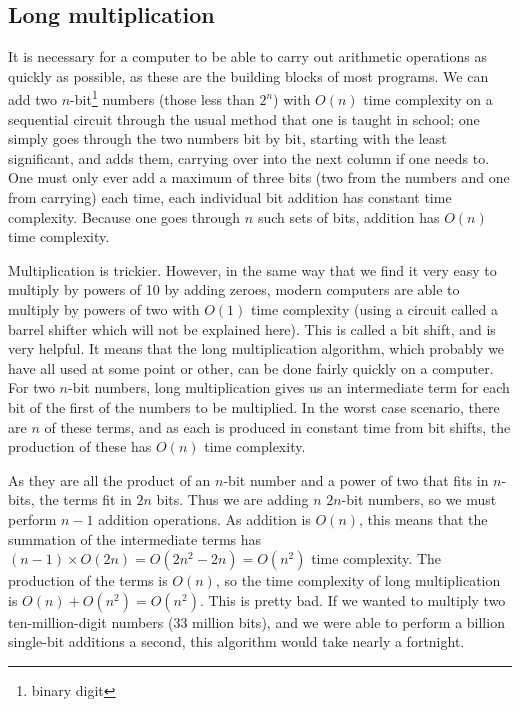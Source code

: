 \documentclass[12pt,a4paper]{report}
\begin{document}
\begin{multicols}{2}
	
\subsection{Long multiplication}
It is necessary for a computer to be able to carry out arithmetic operations as quickly as possible, as these are the building blocks of most programs. We can add two \(n\)-bit\footnote{binary digit} numbers (those less than \(2^n\)) with \(O(n)\) time complexity on a sequential circuit through the usual method that one is taught in school; one simply goes through the two numbers bit by bit, starting with the least significant, and adds them, carrying over into the next column if one needs to. One must only ever add a maximum of three bits (two from the numbers and one from carrying) each time, each individual bit addition has constant time complexity. Because one goes through \(n\) such sets of bits, addition has \(O(n)\) time complexity.

Multiplication is trickier. However, in the same way that we find it very easy to multiply by powers of 10 by adding zeroes, modern computers are able to multiply by powers of two with \(O(1)\) time complexity (using a circuit called a barrel shifter which will not be explained here). This is called a bit shift, and is very helpful. It means that the long multiplication algorithm, which probably we have all used at some point or other, can be done fairly quickly on a computer. For two \(n\)-bit numbers, long multiplication gives us an intermediate term for each  bit of the first of the numbers to be multiplied. In the worst case scenario, there are \(n\) of these terms, and as each is produced in constant time from bit shifts, the production of these has \(O(n)\) time complexity.

As they are all the product of an \(n\)-bit number and a power of two that fits in \(n\)-bits, the terms fit in \(2n\) bits. Thus we are adding \(n\) \(2n\)-bit numbers, so we must perform \(n-1\) addition operations. As addition is \(O(n)\), this means that the summation of the intermediate terms has \((n-1)\times{}O(2n)=O(2n^2-2n)=O(n^2)\) time complexity. The production of the terms is \(O(n)\), so the time complexity of long multiplication is \(O(n)+O(n^2)=O(n^2)\). This is pretty bad. If we wanted to multiply two ten-million-digit numbers (33 million bits), and we were able to perform a billion single-bit additions a second, this algorithm would take nearly a fortnight.


\end{multicols}
\end{document}
